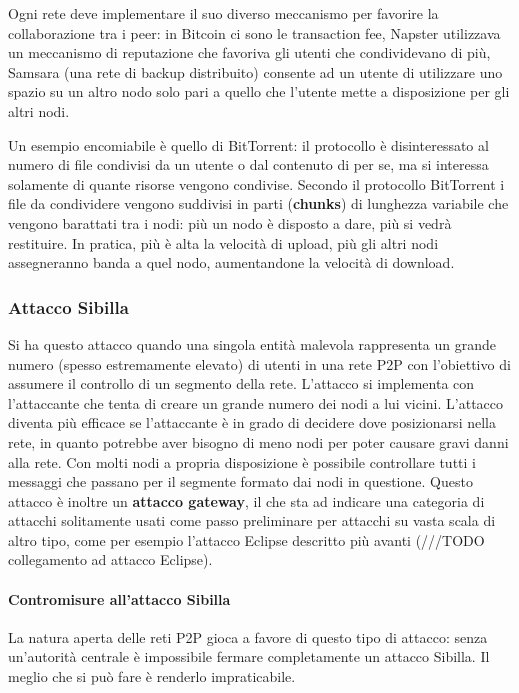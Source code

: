 Ogni rete deve implementare il suo diverso meccanismo per favorire la collaborazione tra i peer: in Bitcoin ci sono le transaction fee, Napster utilizzava un meccanismo di reputazione che favoriva gli utenti che condividevano di più, Samsara (una rete di backup distribuito) consente ad un utente di utilizzare uno spazio su un altro nodo solo pari a quello che l'utente mette a disposizione per gli altri nodi.

Un esempio encomiabile è quello di BitTorrent: il protocollo è disinteressato al numero di file condivisi da un utente o dal contenuto di per se, ma si interessa solamente di quante risorse vengono condivise. Secondo il protocollo BitTorrent i file da condividere vengono suddivisi in parti (\textbf{chunks}) di lunghezza variabile che vengono barattati tra i nodi: più un nodo è disposto a dare, più si vedrà restituire. In pratica, più è alta la velocità di upload, più gli altri nodi assegneranno banda a quel nodo, aumentandone la velocità di download.

\subsubsection{Attacco Sibilla}\label{attacco-sibilla}

Si ha questo attacco quando una singola entità malevola rappresenta un grande numero (spesso estremamente elevato) di utenti in una rete P2P con l'obiettivo di assumere il controllo di un segmento della rete. L'attacco si implementa con l'attaccante che tenta di creare un grande numero dei nodi a lui vicini. L'attacco diventa più efficace se l'attaccante è in grado di decidere dove posizionarsi nella rete, in quanto potrebbe aver bisogno di meno nodi per poter causare gravi danni alla rete. Con molti nodi a propria disposizione è possibile controllare tutti i messaggi che passano per il segmente formato dai nodi in questione. Questo attacco è inoltre un \textbf{attacco gateway}, il che sta ad indicare una categoria di attacchi solitamente usati come passo preliminare per attacchi su vasta scala di altro tipo, come per esempio l'attacco Eclipse descritto più avanti (///TODO collegamento ad attacco Eclipse).

\paragraph{Contromisure all'attacco Sibilla}\label{contromisure-allattacco-sibilla}

La natura aperta delle reti P2P gioca a favore di questo tipo di attacco: senza un'autorità centrale è impossibile fermare completamente un attacco Sibilla. Il meglio che si può fare è renderlo impraticabile.

